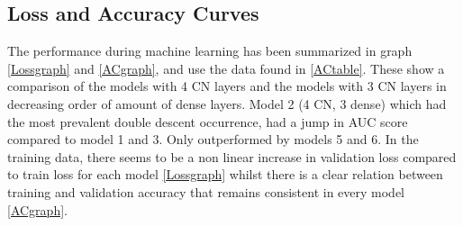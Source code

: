 \subsection{Loss and Accuracy Curves}
The performance during machine learning has been summarized in graph \ref{Lossgraph} and \ref{ACgraph}, and use the data found in \ref{ACtable}. These show a comparison of the models with 4 CN layers and the models with 3 CN layers in decreasing order of amount of dense layers. Model 2 (4 CN, 3 dense) which had the most prevalent double descent occurrence, had a jump in AUC score compared to model 1 and 3. Only outperformed by models 5 and 6. In the training data, there seems to be a non linear increase in validation loss compared to train loss for each model \ref{Lossgraph} whilst there is a clear relation between training and validation accuracy that remains consistent in every model \ref{ACgraph}.